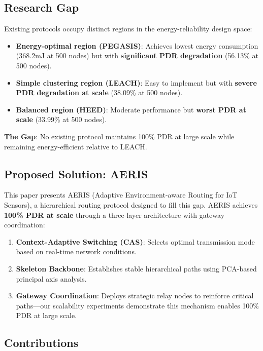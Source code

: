\documentclass[twocolumn]{article}
\begin{document}
\subsection{Research Gap}

Existing protocols occupy distinct regions in the energy-reliability design space:

\begin{itemize}
    \item \textbf{Energy-optimal region (PEGASIS)}: Achieves lowest energy
    consumption (368.2mJ at 500 nodes) but with \textbf{significant PDR
    degradation} (56.13\% at 500 nodes).
    \item \textbf{Simple clustering region (LEACH)}: Easy to implement
    but with \textbf{severe PDR degradation at scale} (38.09\% at 500 nodes).
    \item \textbf{Balanced region (HEED)}: Moderate performance but
    \textbf{worst PDR at scale} (33.99\% at 500 nodes).
\end{itemize}

\textbf{The Gap}: No existing protocol maintains 100\% PDR at large scale
while remaining energy-efficient relative to LEACH.

\subsection{Proposed Solution: AERIS}

This paper presents AERIS (Adaptive Environment-aware Routing for IoT Sensors),
a hierarchical routing protocol designed to fill this gap. AERIS achieves
\textbf{100\% PDR at scale} through a three-layer architecture with gateway
coordination:

\begin{enumerate}
    \item \textbf{Context-Adaptive Switching (CAS)}: Selects optimal
    transmission mode based on real-time network conditions.
    \item \textbf{Skeleton Backbone}: Establishes stable hierarchical paths
    using PCA-based principal axis analysis.
    \item \textbf{Gateway Coordination}: Deploys strategic relay nodes to
    reinforce critical paths---our scalability experiments demonstrate this
    mechanism enables 100\% PDR at large scale.
\end{enumerate}

\subsection{Contributions}
\end{document}
